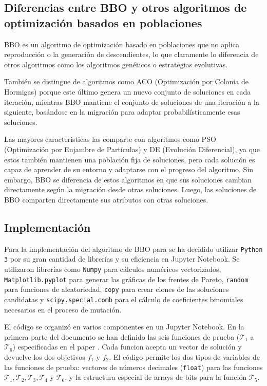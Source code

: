 \subsection{Diferencias entre BBO y otros algoritmos de optimización basados en poblaciones}

BBO es un algoritmo de optimización basado en poblaciones que no aplica reproducción o la generación de descendientes, lo que claramente lo diferencia de otros algoritmos como los algoritmos genéticos o estrategias evolutivas.

También se distingue de algoritmos como ACO (Optimización por Colonia de Hormigas) porque este último genera un nuevo conjunto de soluciones en cada iteración, mientras BBO mantiene el conjunto de soluciones de una iteración a la siguiente, basándose en la migración para adaptar probabilísticamente esas soluciones.

Las mayores características las comparte con algoritmos como PSO (Optimización por Enjambre de Partículas) y DE (Evolución Diferencial), ya que estos también mantienen una población fija de soluciones, pero cada solución es capaz de aprender de su entorno y adaptarse con el progreso del algoritmo.
Sin embargo, BBO se diferencia de estos algoritmos en que sus soluciones cambian directamente según la migración desde otras soluciones. Luego, las soluciones de BBO comparten directamente sus atributos con otras soluciones.

\subsection{Implementación}
\label{sec:meta2_implementacion}
Para la implementación del algoritmo de BBO para se ha decidido utilizar \verb|Python 3| por su gran cantidad de librerías y su eficiencia en Jupyter Notebook. Se utilizaron librerías como \verb|Numpy| para cálculos numéricos vectorizados, \verb|Matplotlib.pyplot| para generar las gráficas de los frentes de Pareto, \verb|random| para funciones de aleatoriedad, \verb|copy| para crear clones de las soluciones candidatas y \verb|scipy.special.comb| para el cálculo de coeficientes binomiales necesarios en el proceso de mutación.

El código se organizó en varios componentes en un Jupyter Notebook. En la primera parte del documento se han definido las seis funciones de prueba ($\mathcal{T}_1$ a $\mathcal{T}_6$) especificadas en el paper \cite{zitzler2000comparison}. Cada funcion acepta un vector de solución y devuelve los dos objetivos $f_1$ y $f_2$. El código permite los dos tipos de variables de las funciones de prueba: vectores de números decimales (\verb|float|) para las funciones $\mathcal{T}_1, \mathcal{T}_2, \mathcal{T}_3, \mathcal{T}_4$ y $\mathcal{T}_6$, y la estructura especial de arrays de bits para la función $\mathcal{T}_5$.

